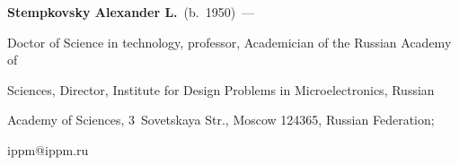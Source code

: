 \vspace*{3pt}



\noindent

\textbf{Stempkovsky Alexander L.}\ (b.\ 1950)~--- 

Doctor of Science in technology, professor, Academician of the Russian Academy of 

Sciences, Director, Institute for Design Problems in Microelectronics, Russian 

Academy of Sciences, 3~Sovetskaya Str., Moscow 124365, Russian Federation; 

ippm@ippm.ru



\label{end\stat}





\renewcommand{\bibname}{\protect\rm Литература}  

